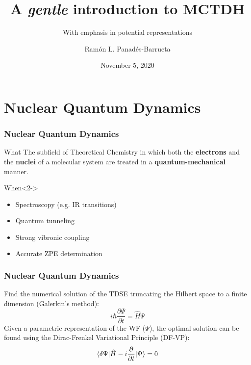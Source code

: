 \documentclass{beamer}
\title[Intro MCTDH]{A \emph{gentle} introduction to MCTDH}
\subtitle{\footnotesize With emphasis in potential representations}
\author[Panadés-Barrueta]{Ramón L. Panadés-Barrueta}
\institute{Computational Chemical Physics Group. \\ University of Twente.}
\date{\small November 5, 2020}
\begin{document}
\frame{\titlepage}

\begin{frame}
  \tableofcontents
\end{frame}

\section{Nuclear Quantum Dynamics}
\label{nqd}

\begin{frame}
  \frametitle{Nuclear Quantum Dynamics}
  \begin{block}{What}
   \justifying
   The subfield of Theoretical Chemistry in which both the \textbf{electrons} and the \textbf{nuclei} of
   a molecular system are treated in a \textbf{quantum-mechanical} manner. 
  \end{block}
  \begin{exampleblock}{When}<2->
    \begin{itemize}
    \item Spectroscopy (e.g. IR transitions)
    \item Quantum tunneling
    \item Strong vibronic coupling
    \item Accurate ZPE determination
    \end{itemize}
  \end{exampleblock}
\end{frame}

\begin{frame}
  \frametitle{Nuclear Quantum Dynamics}
  Find the numerical solution of the TDSE truncating the Hilbert space to a finite dimension (Galerkin's method):
\begin{equation}
  i\hbar\frac{\partial\Psi}{\partial t} = \hat{H}\Psi
\end{equation}
Given a parametric representation of the WF (\(\Psi\)), the optimal solution can be found using the Dirac-Frenkel Variational Principle (DF-VP):
\begin{equation}
	\braket{\delta\Psi|\hat{H}-i\frac{\partial }{\partial t}|\Psi} = 0
\end{equation}
\end{frame}
\end{document}
